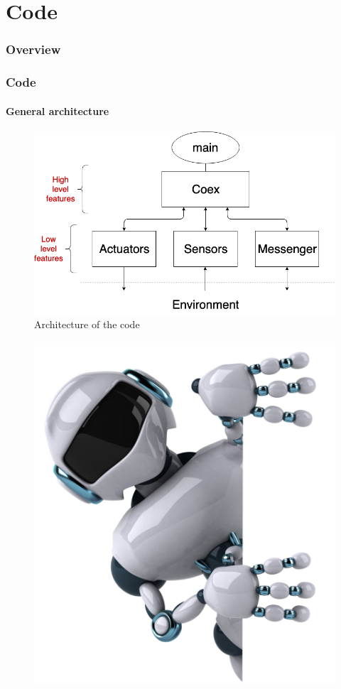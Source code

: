 \documentclass[10pt]{beamer}
\begin{document}
\section{Code} 

\begin{frame}
\frametitle{Overview}
\tableofcontents[currentsection,subsectionstyle=shaded]
\end{frame}

\begin{frame}
\frametitle{Code}
\framesubtitle{General architecture}
\begin{figure}[hbtp]
\centering
\includegraphics[scale=0.38]{figures/architecture.png}
\caption{Architecture of the code}
\label{fig:architecture}
\end{figure}
\end{frame}



\begin{frame}
\begin{figure}[hbtp]
\centering
\includegraphics[scale=0.1]{figures/bye-bye.jpeg}
\end{figure}
\end{frame}

\end{document}
